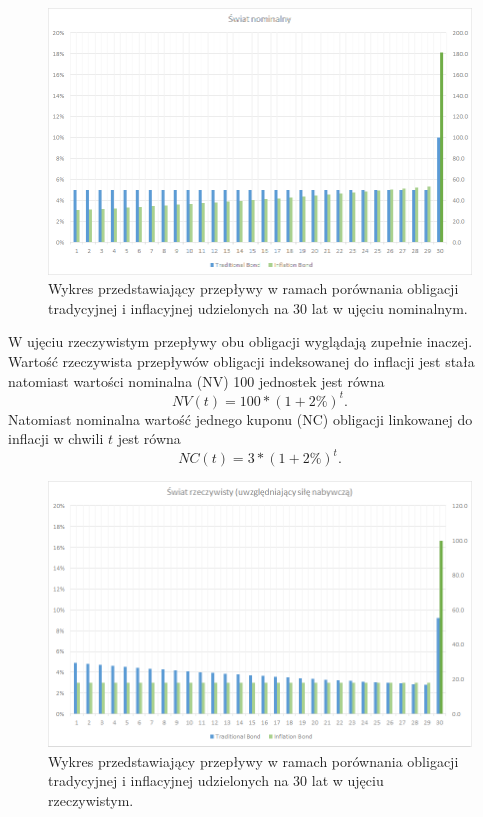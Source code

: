 \documentclass{mini}
\theoremstyle{mythstyle}
\begin{document}
		\begin{figure} [h]
		\centering
		\includegraphics[scale=0.7]{graphics/nominalworld.png}
		\caption{Wykres przedstawiający przepływy w ramach porównania obligacji tradycyjnej i inflacyjnej udzielonych na 30 lat w ujęciu nominalnym.}
	\end{figure}
	W ujęciu rzeczywistym przepływy obu obligacji wyglądają zupełnie inaczej. Wartość rzeczywista przepływów obligacji indeksowanej do inflacji jest stała natomiast wartości nominalna (NV) 100 jednostek jest równa
		\begin{equation*}
	NV(t) = 100 * (1+2\%)^t.
	\end{equation*}
	Natomiast nominalna wartość jednego kuponu (NC) obligacji linkowanej do inflacji w chwili $t$ jest równa
	\begin{equation*}
	NC(t) = 3 * (1+2\%)^t.
	\end{equation*}
	\begin{figure} [h]
	\centering
	\includegraphics[scale=0.7]{graphics/realworld.png}
	\caption{Wykres przedstawiający przepływy w ramach porównania obligacji tradycyjnej i inflacyjnej udzielonych na 30 lat w ujęciu rzeczywistym.}
\end{figure}
	
\end{document}
